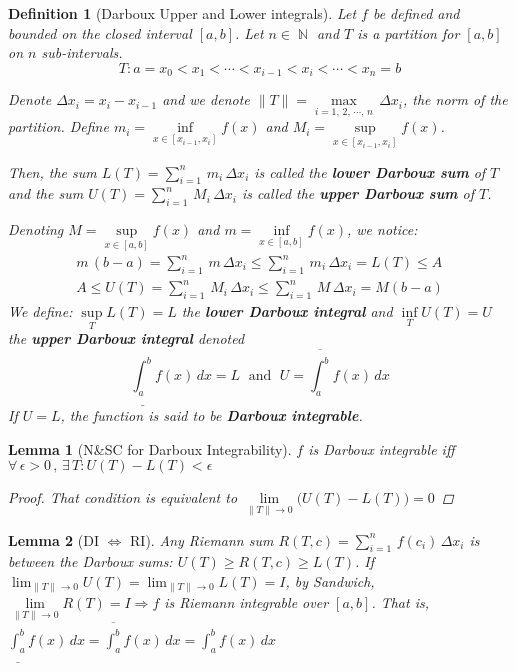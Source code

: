 \documentclass[12pt]{article}
\let\RA\Rightarrow
\let\LR\Leftrightarrow
\newcommand{\Forall}[1]{\forall\,{#1}\,,\,}
\newcommand{\Exist}[1]{\exists\,{#1}:}
\DeclareMathOperator{\N}{\mathbb{N}}
\newtheorem{definition}{Definition}[subsection]
\newtheorem{lemma}{Lemma}[subsection]
\begin{document}
\begin{definition}[Darboux Upper and Lower integrals]
  Let $f$ be defined and bounded on the closed interval $[a,b]$. Let $n\in\N$ and $T$ is a partition for $[a,b]$ on $n$ sub-intervals. $$T: a=x_0<x_1<\cdots<x_{i-1}<x_i<\cdots<x_n=b$$
  
  Denote $\Delta x_i=x_i-x_{i-1}$ and we denote $\|T\|=\max\limits_{i=1,\,2,\,\cdots,\,n}\,\Delta x_i$, the norm of the partition. Define $m_i=\inf\limits_{x\in[x_{i-1},x_i]}f(x)$ and $M_i=\sup\limits_{x\in[x_{i-1},x_i]}f(x)$. 
  
  Then, the sum $\displaystyle L(T)=\sum_{i=1}^n\,m_i\,\Delta x_i$ is called the \textbf{lower Darboux sum} of $T$ and the sum $\displaystyle U(T)=\sum_{i=1}^n\,M_i\,\Delta x_i$ is called the \textbf{upper Darboux sum} of $T$.
  
  Denoting $M=\sup\limits_{x\in[a,b]}f(x)$ and $m=\inf\limits_{x\in[a,b]}f(x)$, we notice: 
  \begin{align*}
    m\,(b-a)=\sum_{i=1}^n\,m\,\Delta x_i\leq\sum_{i=1}^n\,m_i\,\Delta x_i=L(T)\leq A\\ A\leq U(T)=\sum_{i=1}^n\,M_i\,\Delta x_i\leq \sum_{i=1}^n\,M\,\Delta x_i=M(b-a)
  \end{align*}
  We define: $\sup\limits_T L(T)=L$ the \textbf{lower Darboux integral} and $\inf\limits_T U(T)=U$ the \textbf{upper Darboux integral} denoted
  $$\underline{\int_a^b}f(x)\,dx=L\;\text{ and }\; U=\overline{\int_a^b}f(x)\,dx$$
  If $U=L$, the function is said to be \textbf{Darboux integrable}.
\end{definition}

\begin{lemma}[N\&SC for Darboux Integrability]
  $f$ is Darboux integrable iff $\Forall{\epsilon>0}\Exist{T}U(T)-L(T)<\epsilon$
  \begin{proof}
    That condition is equivalent to $\lim\limits_{\|T\|\to 0}\big(U(T)-L(T)\big)=0$
  \end{proof}
\end{lemma}

\begin{lemma}[DI $\LR$ RI]
  Any Riemann sum $\displaystyle R(T,c)=\sum_{i=1}^n\,f(c_i)\,\Delta x_i$ is between the Darboux sums: $U(T)\geq R(T,c)\geq L(T)$. If $\displaystyle\lim_{\|T\|\to 0}U(T)=\lim_{\|T\|\to 0}L(T)=I$, by Sandwich, $\lim\limits_{\|T\|\to 0}R(T)=I\RA f$ is Riemann integrable over $[a,b]$. That is, $\displaystyle \underline{\int_a^b}f(x)\,dx=\overline{\int_a^b}f(x)\,dx=\int_a^b f(x)\,dx$
\end{lemma}
\end{document}
